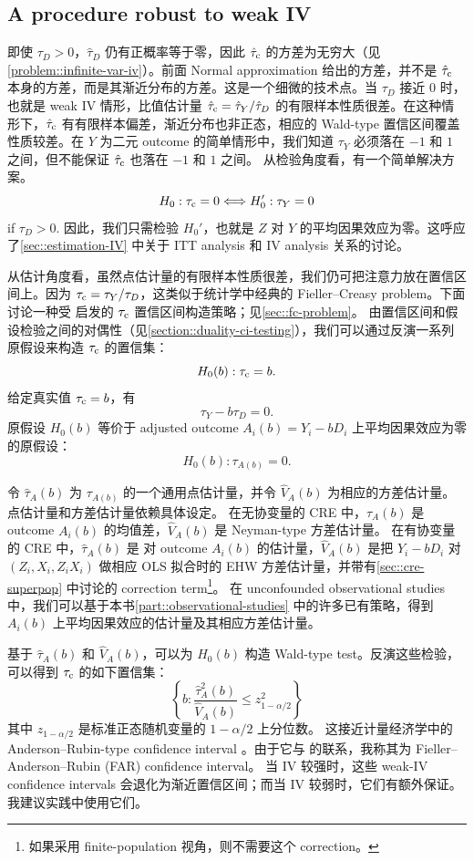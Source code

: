 \subsection{A procedure robust to weak IV}
 
即使 $\tau_D >0$，$\hat{\tau}_D$ 仍有正概率等于零，因此 $\hat{\tau}_{\textup{c}}$ 的方差为无穷大（见\cref{problem::infinite-var-iv}）。前面 Normal approximation 给出的方差，并不是 $\hat{\tau}_{\textup{c}}$ 本身的方差，而是其渐近分布的方差。这是一个细微的技术点。当 $ \tau_D$ 接近 $0$ 时，也就是 weak IV 情形，比值估计量 $\hat{\tau}_{\textup{c}} = \hat{\tau}_Y / \hat{\tau}_D$ 的有限样本性质很差。在这种情形下，$\hat{\tau}_{\textup{c}}$ 有有限样本偏差，渐近分布也非正态，相应的 Wald-type 置信区间覆盖性质较差。在 $Y$ 为二元 outcome 的简单情形中，我们知道 $\tau_Y$ 必须落在 $-1$ 和 $1$ 之间，但不能保证 $\hat{\tau}_{\textup{c}}$ 也落在 $-1$ 和 $1$ 之间。
从检验角度看，有一个简单解决方案。
$$
H_0: \tau_{\textup{c}}  = 0 \Longleftrightarrow H_0': \tau_Y = 0
$$
if $\tau_D > 0$. 
因此，我们只需检验 $H_0'$，也就是 $Z$ 对 $Y$ 的平均因果效应为零。这呼应了\cref{sec::estimation-IV} 中关于 ITT analysis 和 IV analysis 关系的讨论。


从估计角度看，虽然点估计量的有限样本性质很差，我们仍可把注意力放在置信区间上。因为 $\tau_{\textup{c}} = \tau_Y / \tau_D$，这类似于统计学中经典的 Fieller--Creasy problem。下面讨论一种受 \citet{fieller1954some} 启发的 $\tau_{\textup{c}}$ 置信区间构造策略；见\cref{sec::fc-problem}。
由置信区间和假设检验之间的对偶性（见\cref{section::duality-ci-testing}），我们可以通过反演一系列原假设来构造 $\tau_{\textup{c}}$ 的置信集：
$$
H_0(b): \tau_{\textup{c}} = b . 
$$ 
给定真实值 $\tau_{\textup{c}} = b$，有
$$
 \tau_Y  - b  \tau_D  = 0.
$$
原假设 $H_0(b)$ 等价于 adjusted outcome $A_i( b) = Y_i - b  D_i $ 上平均因果效应为零的原假设：
$$
H_0(b): \tau_{A(b)} = 0 .
$$


令 $ \hat{\tau}_A(b)$ 为 $\tau_{A(b)} $ 的一个通用点估计量，并令 $\hat{V}_A( b )$ 为相应的方差估计量。点估计量和方差估计量依赖具体设定。
在无协变量的 CRE 中，$ \hat{\tau}_A(b)$ 是 outcome $A_i( b)$ 的均值差，$\hat{V}_A( b )$ 是 Neyman-type 方差估计量。
在有协变量的 CRE 中，$ \hat{\tau}_A(b)$ 是 \citet{lin2013} 对 outcome $A_i( b)$ 的估计量，$\hat{V}_A( b )$ 是把 $Y_i - b D_i$ 对 $(Z_i, X_i, Z_i X_i)$ 做相应 OLS 拟合时的 EHW 方差估计量，并带有\cref{sec::cre-superpop} 中讨论的 correction term\footnote{如果采用 finite-population 视角，则不需要这个 correction。}。
在 unconfounded observational studies 中，我们可以基于本书\cref{part::observational-studies} 中的许多已有策略，得到 $A_i( b)$ 上平均因果效应的估计量及其相应方差估计量。


基于 $ \hat{\tau}_A(b)$ 和 $\hat{V}_A( b )$，可以为 $H_0(b)$ 构造 Wald-type test。反演这些检验，可以得到 $\tau_{\textup{c}}$ 的如下置信集：
$$
\left\{  b:    \frac{   \hat{\tau}_A^2(b)  }{  \hat{V}_A(b)  } \leq z_{1-\alpha/2}^2 \right\}
$$
其中 $z_{1-\alpha/2}$ 是标准正态随机变量的 $1-\alpha/2$ 上分位数。
这接近计量经济学中的 Anderson--Rubin-type confidence interval \citep{anderson1950asymptotic}。由于它与 \citet{fieller1954some} 的联系，我称其为 Fieller--Anderson--Rubin (FAR) confidence interval。
当 IV 较强时，这些 weak-IV confidence intervals 会退化为渐近置信区间；而当 IV 较弱时，它们有额外保证。我建议实践中使用它们。



